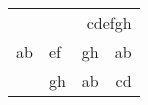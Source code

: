 \documentclass{article}
\begin{document}
\begin{tabular}{c|l|r|r}
    \hline
    \multirow{3}{*}{ab} & \multicolumn{3}{r}{cdefgh} \\
    \cline{2-4}
    & ef & gh & ab \\ 
    \cline{2-4}
    & gh & ab & cd \\
    \hline 
\end{tabular}
\end{document}
